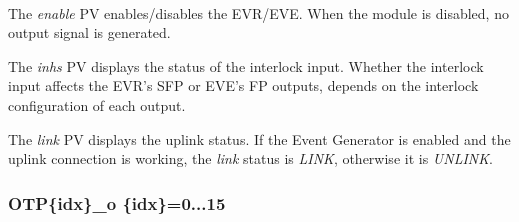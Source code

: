 \documentclass[openany]{article}
\begin{document}
			\paragraph{} The \emph{enable} PV enables/disables the EVR/EVE. When the module is disabled, no output signal is generated.
			\par The \emph{inhs} PV displays the status of the interlock input. Whether the interlock input affects the EVR's SFP or EVE's FP outputs, depends on the interlock configuration of each output.
			\par The \emph{link} PV displays the uplink status. If the Event Generator is enabled and the uplink connection is working, the \emph{link} status is \emph{LINK}, otherwise it is \emph{UNLINK}.

		\subsubsection{OTP\{idx\}\_o \{idx\}=0...15}\label{pvgroup:evre-otp}
\end{document}
